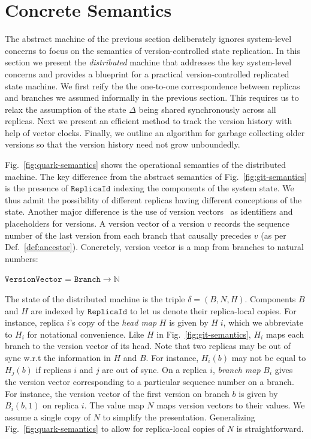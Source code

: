\section{Concrete Semantics}
\label{sec:concrete-sem}



The \quark abstract machine of the previous section deliberately
ignores system-level concerns to focus on the semantics of
version-controlled state replication. In this section we present the
\quark \emph{distributed} machine that addresses the key system-level
concerns and provides a blueprint for a practical version-controlled
replicated state machine. We first reify the the one-to-one
correspondence between replicas and branches we assumed informally in
the previous section. This requires us to relax the assumption of the
state $\Delta$ being shared synchronously across all replicas. Next we
present an efficient method to track the version history with help
of vector clocks. Finally, we outline an algorithm for garbage
collecting older versions so that the version history need not grow
unboundedly.

Fig.~\ref{fig:quark-semantics} shows the operational semantics of the
distributed machine. The key difference from the abstract semantics of
Fig.~\ref{fig:git-semantics} is the presence of $\texttt{ReplicaId}$
indexing the components of the system state. We thus admit the
possibility of different replicas having different conceptions of the
state. Another major difference is the use of version
vectors~\cite{vectorclock} as identifiers and placeholders for
versions. A version vector of a version $v$ records the sequence
number of the last version from each branch that causally precedes $v$
(as per Def.~\ref{def:ancestor}).  Concretely, version vector is a map
from branches to natural numbers:
\begin{center}
  $\texttt{VersionVector}$ = $\texttt{Branch} \rightarrow \mathbb{N}$
\end{center}

The state of the distributed machine is the triple $\delta = (B,N,H)$.
Components $B$ and $H$ are indexed by $\texttt{ReplicaId}$ to let us
denote their replica-local copies. For instance, replica $i$'s copy of
the \emph{head map} $H$ is given by $H\;i$, which we abbreviate to
$H_i$ for notational convenience. Like $H$ in
Fig.~\ref{fig:git-semantics}, $H_i$ maps each branch to the version
vector of its head. Note that two replicas may be out of sync w.r.t
the information in $H$ and $B$.  For instance, $H_i(b)$ may not be
equal to $H_j(b)$ if replicas $i$ and $j$ are out of sync. On a
replica $i$, \emph{branch map} $B_i$ gives the version vector
corresponding to a particular sequence number on a branch. For
instance, the version vector of the first version on branch $b$ is
given by $B_i(b,1)$ on replica $i$. The value map $N$ maps version
vectors to their values. We assume a single copy of $N$ to simplify
the presentation. Generalizing Fig.~\ref{fig:quark-semantics} to allow
for replica-local copies of $N$ is straightforward.


